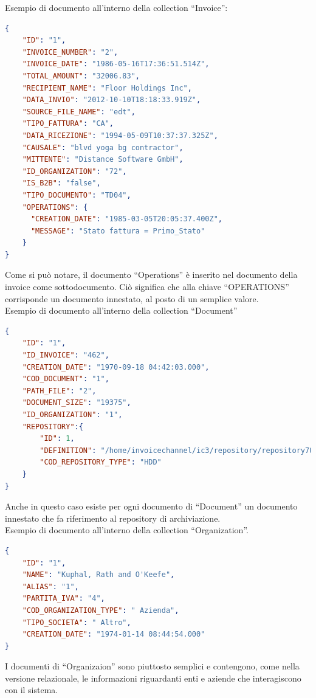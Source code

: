 \noindent Esempio di documento all'interno della collection ``Invoice'':
\begin{lstlisting}[language=json,
        deletekeywords={IDENTITY,INT},
        morekeywords={clustered},    
        framesep=10pt,
        framextopmargin=10pt]
{
    "ID": "1",
    "INVOICE_NUMBER": "2",
    "INVOICE_DATE": "1986-05-16T17:36:51.514Z",
    "TOTAL_AMOUNT": "32006.83",
    "RECIPIENT_NAME": "Floor Holdings Inc",
    "DATA_INVIO": "2012-10-10T18:18:33.919Z",
    "SOURCE_FILE_NAME": "edt",
    "TIPO_FATTURA": "CA",
    "DATA_RICEZIONE": "1994-05-09T10:37:37.325Z",
    "CAUSALE": "blvd yoga bg contractor",
    "MITTENTE": "Distance Software GmbH",
    "ID_ORGANIZATION": "72",
    "IS_B2B": "false",
    "TIPO_DOCUMENTO": "TD04",
    "OPERATIONS": {
      "CREATION_DATE": "1985-03-05T20:05:37.400Z",
      "MESSAGE": "Stato fattura = Primo_Stato"
    }
}
\end{lstlisting}
\noindent Come si può notare, il documento ``Operations'' è inserito nel documento della invoice come sottodocumento. Ciò significa che alla chiave ``OPERATIONS'' corrisponde un documento innestato, al posto di un semplice valore.\\

\noindent Esempio di documento all'interno della collection ``Document''
\begin{lstlisting}[language=json,
        deletekeywords={IDENTITY,INT},
        morekeywords={clustered},    
        framesep=10pt,
        framextopmargin=10pt]
{
    "ID": "1",
    "ID_INVOICE": "462",
    "CREATION_DATE": "1970-09-18 04:42:03.000",
    "COD_DOCUMENT": "1",
    "PATH_FILE": "2",
    "DOCUMENT_SIZE": "19375",
    "ID_ORGANIZATION": "1",
    "REPOSITORY":{
        "ID": 1,
        "DEFINITION": "/home/invoicechannel/ic3/repository/repository70",
        "COD_REPOSITORY_TYPE": "HDD"
    }
}
\end{lstlisting}
\noindent Anche in questo caso esiste per ogni documento di ``Document'' un documento innestato che fa riferimento al repository di archiviazione.\\

\noindent Esempio di documento all'interno della collection ``Organization''.
\begin{lstlisting}[language=json,
        deletekeywords={IDENTITY,INT},
        morekeywords={clustered},    
        framesep=10pt,
        framextopmargin=10pt]
{
    "ID": "1",
    "NAME": "Kuphal, Rath and O'Keefe",
    "ALIAS": "1",
    "PARTITA_IVA": "4",
    "COD_ORGANIZATION_TYPE": " Azienda",
    "TIPO_SOCIETA": " Altro",
    "CREATION_DATE": "1974-01-14 08:44:54.000"
}
\end{lstlisting}
\noindent I documenti di ``Organizaion'' sono piuttosto semplici e contengono, come nella versione relazionale, le informazioni riguardanti enti e aziende che interagiscono con il sistema.\\